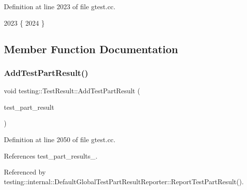 Definition at line 2023 of file gtest.\+cc.


\begin{DoxyCode}
2023                         \{
2024 \}
\end{DoxyCode}


\subsection{Member Function Documentation}
\mbox{\label{classtesting_1_1TestResult_ac28e9821ad3e9314c4fe41b119c5b44d}} 
\subsubsection{\texorpdfstring{Add\+Test\+Part\+Result()}{AddTestPartResult()}}
{\footnotesize\ttfamily void testing\+::\+Test\+Result\+::\+Add\+Test\+Part\+Result (\begin{DoxyParamCaption}\item[{const \hyperlink{classtesting_1_1TestPartResult}{Test\+Part\+Result} \&}]{test\+\_\+part\+\_\+result }\end{DoxyParamCaption})\hspace{0.3cm}{\ttfamily [private]}}



Definition at line 2050 of file gtest.\+cc.



References test\+\_\+part\+\_\+results\+\_\+.



Referenced by testing\+::internal\+::\+Default\+Global\+Test\+Part\+Result\+Reporter\+::\+Report\+Test\+Part\+Result().


